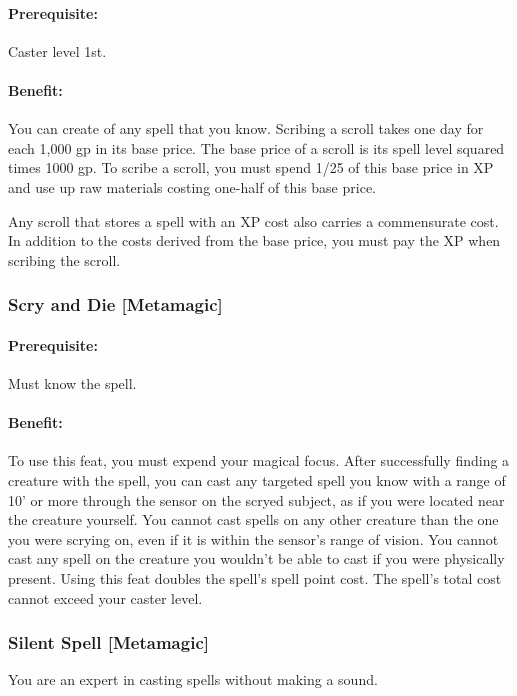 \paragraph{Prerequisite:}
Caster level 1st.

\paragraph{Benefit:}
You can create  of any spell that you know. 
Scribing a scroll takes one day for each 1,000 gp in its base price. 
The base price of a scroll is its spell level squared times 1000 gp.
To scribe a scroll, you must spend 1/25 of this base price in XP and use up raw materials costing one-half of this base price.

Any scroll that stores a spell with an XP cost also carries a commensurate cost. 
In addition to the costs derived from the base price, you must pay the XP when scribing the scroll.
\subsubsection[Scry and Die]{Scry and Die [Metamagic]}
\label{Feat:ScryAndDie}
\paragraph{Prerequisite:} 
Must know the  spell.

\paragraph{Benefit:} To use this feat, you must expend your magical focus. 
After successfully finding a creature with the  spell, 
you can cast any targeted spell you know with a range of 10' or more through the sensor
on the scryed subject, as if you were located near the creature yourself.
You cannot cast spells on any other creature than the one you were scrying on, 
even if it is within the sensor's range of vision. You cannot cast any spell
on the creature you wouldn't be able to cast if you were physically present.
Using this feat doubles the spell's spell point cost.
The spell's total cost cannot exceed your caster level.
\subsubsection[Silent Spell]{Silent Spell [Metamagic]}
\label{Feat:SilentSpell}
You are an expert in casting spells without making a sound.

